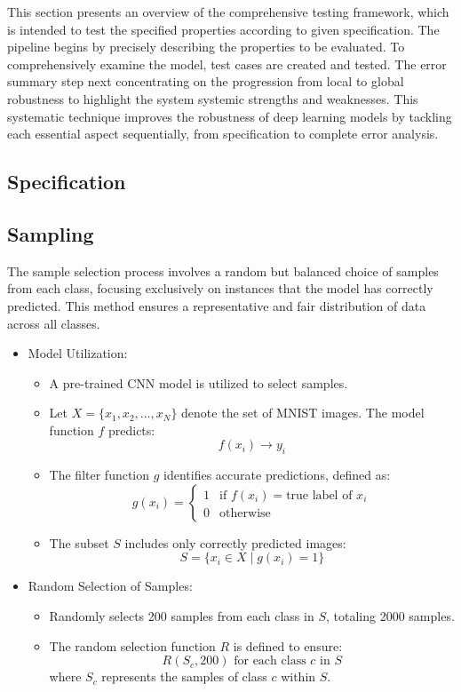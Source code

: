 \documentclass[10pt, conference, a4paper, final]{IEEEtran}
\begin{document}
This section presents an overview of the comprehensive testing framework, which is intended to test the specified properties according to given specification. The pipeline begins by precisely describing the properties to be evaluated. To comprehensively examine the model, test cases are created and tested. The error summary step next concentrating on the progression from local to global robustness to highlight the system systemic strengths and weaknesses. This systematic technique improves the robustness of deep learning models by tackling each essential aspect sequentially, from specification to complete error analysis.
\subsection{Specification}
\subsection{Sampling}
 The sample selection process involves a random but balanced choice of samples from each class, focusing exclusively on instances that the model has correctly predicted. This method ensures a representative and fair distribution of data across all classes.

\begin{itemize}

    
        \item Model Utilization:
            \begin{itemize}
                \item A pre-trained CNN model is utilized to select samples.
                \item Let \( X = \{x_1, x_2, \dots, x_N\} \) denote the set of MNIST images. The model function \( f \) predicts:
                \[ f(x_i) \rightarrow y_i \]
                \item The filter function \( g \) identifies accurate predictions, defined as:
                \[ g(x_i) = 
                \begin{cases} 
                1 & \text{if } f(x_i) = \text{true label of } x_i \\
                0 & \text{otherwise}
                \end{cases} \]
                \item The subset \( S \) includes only correctly predicted images:
                \[ S = \{x_i \in X \mid g(x_i) = 1\} \]
            \end{itemize}
        \item Random Selection of Samples:
            \begin{itemize}
                \item Randomly selects 200 samples from each class in \( S \), totaling 2000 samples.
                \item The random selection function \( R \) is defined to ensure:
                \[ R(S_c, 200) \text{ for each class } c \text{ in } S \]
                where \( S_c \) represents the samples of class \( c \) within \( S \).
            \end{itemize}

\end{itemize}
\end{document}
